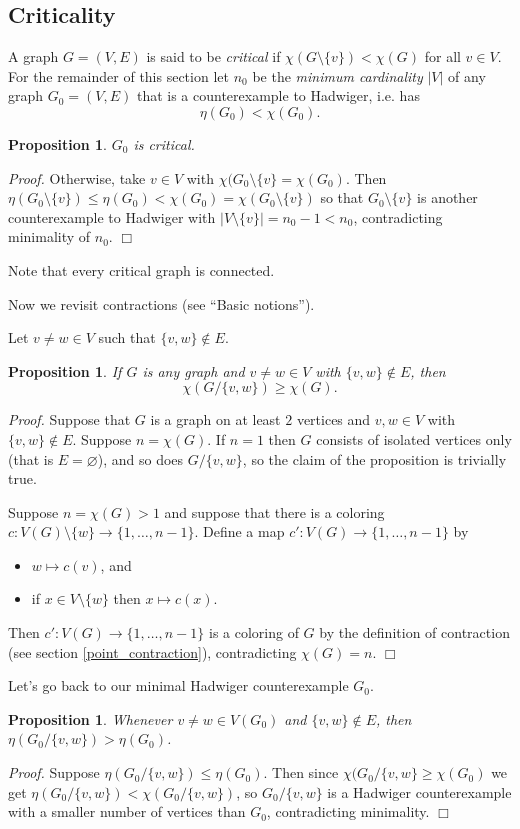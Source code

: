 \documentclass[12pt, a4paper]{amsart}
\newtheorem{proposition}[lemma]{\bf Proposition}
\begin{document}
\subsection{Criticality} A graph $G=(V,E)$ is said to be {\em critical}
if $\chi(G\setminus \{v\}) < \chi(G)$ for all $v\in V$.
For the remainder of this section let $n_0$ be the {\em minimum
cardinality} $|V|$ of any graph $G_0=(V,E)$ that is a counterexample
to Hadwiger, i.e. has $$\eta(G_0) < \chi(G_0).$$
\begin{proposition} 
$G_0$ is critical.
\end{proposition}
{\em Proof.} Otherwise, take $v\in V$ with $\chi(G_0\setminus 
\{v\} = \chi(G_0)$.
Then $\eta(G_0\setminus\{v\}) \leq \eta(G_0) < \chi(G_0) = \chi(G_0
	\setminus\{v\})$ so that $G_0\setminus \{v\}$ is
	another counterexample to Hadwiger with $|V\setminus\{v\}| =
	n_0-1 < n_0$, contradicting minimality of $n_0$. 
	\hfill{$\Box$}

Note that every critical graph is connected.

Now we revisit contractions (see ``Basic notions''). 

Let $v\neq w\in V$ such that $\{v,w\}\notin E$.

\begin{proposition}
If $G$ is any graph and $v\neq w\in V$ with $\{v,w\}\notin E$, then
	$$\chi(G/\{v,w\}) \geq \chi(G).$$
\end{proposition}
{\em Proof.} Suppose that $G$ is a graph on at least $2$ vertices and $v,w\in V$ with
$\{v,w\}\notin E$. Suppose $n=\chi(G)$. If $n=1$ then $G$ consists of isolated
vertices only (that is $E = \varnothing$), and so does $G/\{v,w\}$, so
the claim of the proposition is trivially true.

Suppose $n=\chi(G) > 1$ and suppose that there is a coloring 
$c:V(G)\setminus \{w\} \to \{1,\ldots, n-1\}$. Define
a map $c':V(G) \to \{1,\ldots,n-1\}$ by 
\begin{itemize}
	\item $w\mapsto c(v)$, and
	\item if $x\in V\setminus\{w\}$ then $x \mapsto c(x)$.
\end{itemize}
Then $c':V(G) \to \{1,\ldots,n-1\}$ is a coloring of $G$ by the definition of 
contraction (see section \ref{point_contraction}), contradicting $\chi(G) = n$.
\hfill{$\Box$}

Let's go back to our minimal Hadwiger counterexample $G_0$.

\begin{proposition} \label{contractprop}
Whenever $v\neq w \in V(G_0)$ and $\{v,w\}\notin E$, then
$\eta(G_0/\{v,w\}) > \eta(G_0)$.
\end{proposition}
{\em Proof.} Suppose $\eta(G_0/\{v,w\}) \leq \eta(G_0)$. Then since
$\chi(G_0/\{v,w\} \geq \chi(G_0)$ we get $\eta(G_0/\{v,w\}) < 
\chi(G_0/\{v,w\})$, so $G_0/\{v,w\}$ is a Hadwiger counterexample
with a smaller number of vertices than $G_0$, contradicting minimality.
\hfill{$\Box$}
\end{document}
